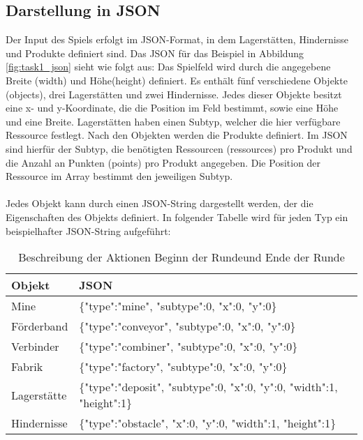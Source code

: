 \subsection{Darstellung in JSON}
Der Input des Spiels erfolgt im JSON-Format, in dem Lagerstätten, Hindernisse und Produkte definiert sind. Das JSON für das Beispiel in Abbildung \ref{fig:task1_json} sieht wie folgt aus:
Das Spielfeld wird durch die angegebene Breite (width) und Höhe(height) definiert. Es enthält fünf verschiedene Objekte (objects), drei Lagerstätten und zwei Hindernisse. Jedes dieser Objekte besitzt eine x- und y-Koordinate, die die Position im Feld bestimmt, sowie eine Höhe und eine Breite. Lagerstätten haben einen Subtyp, welcher die hier verfügbare Ressource festlegt. Nach den Objekten werden die Produkte definiert. Im JSON sind hierfür der Subtyp, die benötigten Ressourcen (ressources) pro Produkt und die Anzahl an Punkten (points) pro Produkt angegeben. Die Position der Ressource im Array bestimmt den jeweiligen Subtyp.
\\\\
Jedes Objekt kann durch einen JSON-String dargestellt werden, der die Eigenschaften des Objekts definiert. In folgender Tabelle wird für jeden Typ ein beispielhafter JSON-String aufgeführt:

\begin{table}
	\begin{center}
		\begin{tabular}{ | l | l | } 
			\hline
			\textbf{Objekt}& \textbf{JSON}\\  \hline
			Mine & \{"type":"mine", "subtype":0, "x":0, "y":0\}\\ \hline
			Förderband & \{"type":"conveyor", "subtype":0, "x":0, "y":0\} \\ \hline
			Verbinder & \{"type":"combiner", "subtype":0, "x":0, "y":0\} \\ \hline
			Fabrik & \{"type":"factory", "subtype":0, "x":0, "y":0\}\\ \hline
			Lagerstätte & \{"type":"deposit", "subtype":0, "x":0, "y":0, "width":1, "height":1\}  \\ \hline
			Hindernisse & \{"type":"obstacle", "x":0, "y":0, "width":1, "height":1\}\\\hline
		\end{tabular}
		\caption{Beschreibung der Aktionen \dq Beginn der Runde\dq  und \dq Ende der Runde\dq }
	\end{center}
\end{table}



